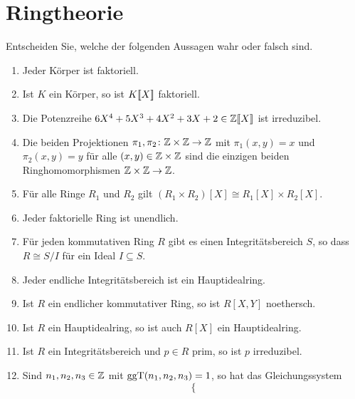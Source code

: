 \section{Ringtheorie}




\begin{question}[subtitle = Multiple Choice]
  Entscheiden Sie, welche der folgenden Aussagen wahr oder falsch sind.
  \begin{enumerate}
    \item
      Jeder Körper ist faktoriell.
    \item
      Ist $K$ ein Körper, so ist $K[\![X]\!]$ faktoriell.
    \item
      Die Potenzreihe $6X^4 + 5X^3 + 4X^2 + 3X + 2 \in \mathbb{Z}[\![X]\!]$ ist irreduzibel.
    \item
      Die beiden Projektionen $\pi_1, \pi_2 \colon \mathbb{Z} \times \mathbb{Z} \to \mathbb{Z}$ mit $\pi_1(x,y) = x$ und $\pi_2(x,y) = y$ für alle $(x,y) \in \mathbb{Z} \times \mathbb{Z}$ sind die einzigen beiden Ringhomomorphismen $\mathbb{Z} \times \mathbb{Z} \to \mathbb{Z}$.
    \item
      Für alle Ringe $R_1$ und $R_2$ gilt $(R_1 \times R_2)[X] \cong R_1[X] \times R_2[X]$.
    \item
      Jeder faktorielle Ring ist unendlich.
    \item
      Für jeden kommutativen Ring $R$ gibt es einen Integritätsbereich $S$, so dass $R \cong S/I$ für ein Ideal $I \subseteq S$.
    \item
      Jeder endliche Integritätsbereich ist ein Hauptidealring.
    \item
      Ist $R$ ein endlicher kommutativer Ring, so ist $R[X,Y]$ noethersch.
    \item
      Ist $R$ ein Hauptidealring, so ist auch $R[X]$ ein Hauptidealring.
    \item
      Ist $R$ ein Integritätsbereich und $p \in R$ prim, so ist $p$ irreduzibel.
    \item
      Sind $n_1, n_2, n_3 \in \mathbb{Z}$ mit $\operatorname{ggT}(n_1, n_2, n_3) = 1$, so hat das Gleichungssystem
      \[
        \left\{
\]
\end{enumerate}
\end{question}
